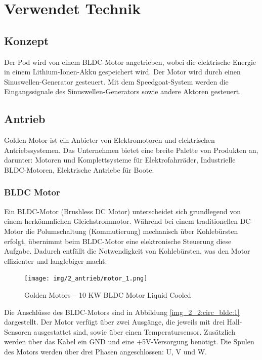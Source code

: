 \chapter{Verwendet Technik}

\section{Konzept}
Der Pod wird von einem BLDC-Motor angetrieben, wobei die elektrische Energie in einem Lithium-Ionen-Akku gespeichert wird. Der Motor wird durch einen Sinuswellen-Generator gesteuert. Mit dem Speedgoat-System werden die Eingangssignale des Sinuswellen-Generators sowie andere Aktoren gesteuert.

\section{Antrieb}
\label{Golden_Motor}
Golden Motor ist ein Anbieter von Elektromotoren und elektrischen Antriebssystemen. Das Unternehmen bietet eine breite Palette von Produkten an, darunter:
Motoren und Komplettsysteme für Elektrofahrräder, Industrielle BLDC-Motoren, Elektrische Antriebe für Boote.


\subsection{BLDC Motor}
\label{BLDC_Motor}


Ein BLDC-Motor (Brushless DC Motor) unterscheidet sich grundlegend von einem herkömmlichen Gleichstrommotor. Während bei einem traditionellen DC-Motor die Polumschaltung (Kommutierung) mechanisch über Kohlebürsten erfolgt, übernimmt beim BLDC-Motor eine elektronische Steuerung diese Aufgabe. Dadurch entfällt die Notwendigkeit von Kohlebürsten, was den Motor effizienter und langlebiger macht\cite{mathworks:bldc_motor}.

\begin{figure}[ht]
	\begin{center}
		\texttt{[image: img/2\_antrieb/motor\_1.png]}
		\caption{Golden Motors – 10 KW BLDC Motor Liquid Cooled}
		\label{img_2_2:antrieb_motor:1}
	\end{center}
\end{figure}
\pagebreak[4]


Die Anschlüsse des BLDC-Motors sind in Abbildung \ref{img_2_2:circ_bldc:1} dargestellt. Der Motor verfügt über zwei Ausgänge, die jeweils mit drei Hall-Sensoren ausgestattet sind, sowie über einen Temperatursensor. Zusätzlich werden über das Kabel ein GND und eine +5V-Versorgung benötigt. Die Spulen des Motors werden über drei Phasen angeschlossen: U, V und W.

